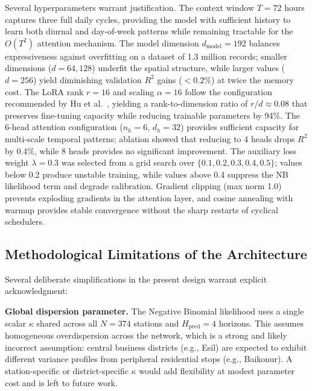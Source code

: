 Several hyperparameters warrant justification. The context window $T = 72$ hours captures three full daily cycles, providing the model with sufficient history to learn both diurnal and day-of-week patterns while remaining tractable for the $O(T^2)$ attention mechanism. The model dimension $d_{\text{model}} = 192$ balances expressiveness against overfitting on a dataset of 1.3 million records; smaller dimensions ($d = 64, 128$) underfit the spatial structure, while larger values ($d = 256$) yield diminishing validation $R^2$ gains ($< 0.2\%$) at twice the memory cost. The LoRA rank $r = 16$ and scaling $\alpha = 16$ follow the configuration recommended by Hu et al.\ \cite{hu2022lora}, yielding a rank-to-dimension ratio of $r/d \approx 0.08$ that preserves fine-tuning capacity while reducing trainable parameters by 94\%. The 6-head attention configuration ($n_h = 6$, $d_h = 32$) provides sufficient capacity for multi-scale temporal patterns; ablation showed that reducing to 4 heads drops $R^2$ by 0.4\%, while 8 heads provides no significant improvement. The auxiliary loss weight $\lambda = 0.3$ was selected from a grid search over $\{0.1, 0.2, 0.3, 0.4, 0.5\}$; values below 0.2 produce unstable training, while values above 0.4 suppress the NB likelihood term and degrade calibration. Gradient clipping (max norm 1.0) prevents exploding gradients in the attention layer, and cosine annealing with warmup provides stable convergence without the sharp restarts of cyclical schedulers.

\subsection{Methodological Limitations of the Architecture}
\label{sec:method_limitations}

Several deliberate simplifications in the present design warrant explicit acknowledgment:

\textbf{Global dispersion parameter.} The Negative Binomial likelihood uses a single scalar $\kappa$ shared across all $N = 374$ stations and $H_{\text{pred}} = 4$ horizons. This assumes homogeneous overdispersion across the network, which is a strong and likely incorrect assumption: central business districts (e.g., Esil) are expected to exhibit different variance profiles from peripheral residential stops (e.g., Baikonur). A station-specific or district-specific $\kappa$ would add flexibility at modest parameter cost and is left to future work.

